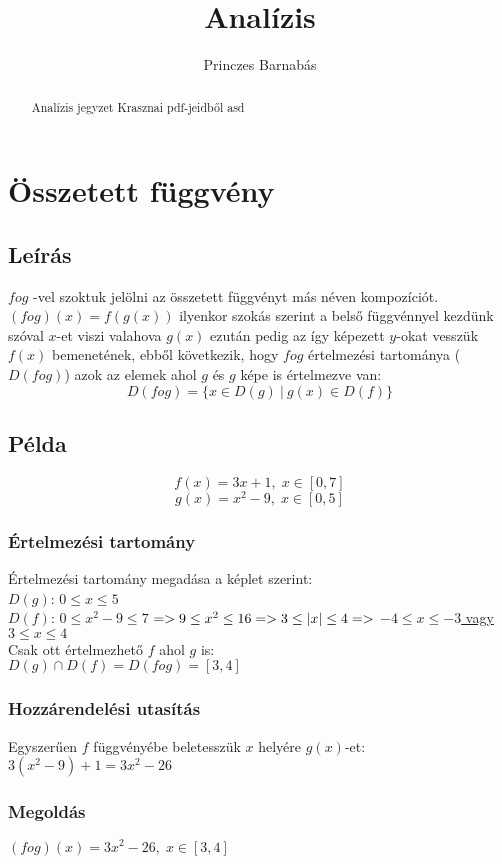 \documentclass{article}
\title{Analízis}
\author{Princzes
Barnabás}
\theoremstyle{mytheoremstyle}
\theoremstyle{mytheoremstyle}
\theoremstyle{myproblemstyle}
\begin{document}
\maketitle
\begin{abstract}
    Analízis jegyzet Krasznai pdf-jeidből asd
\end{abstract}
\section{Összetett függvény}
\subsection{Leírás}
$fog$ -vel szoktuk jelölni az összetett függvényt más néven kompozíciót.\\
$(fog)(x) = f(g(x))$ ilyenkor szokás szerint a belső függvénnyel
kezdünk szóval $x$-et viszi valahova $g(x)$ ezután pedig az így képezett $y$-okat vesszük
$f(x)$ bemenetének, ebből következik, hogy $fog$ értelmezési tartománya ($D(fog)$)
azok az elemek ahol $g$ és $g$ képe is értelmezve van:
$$D(fog)=\{x\in D(g)\:|\:g(x)\in D(f)\}$$
\subsection{Példa}
$$f(x)=3x+1,\;x\in [0,7]$$
$$g(x)=x^2-9,\;x\in [0,5]$$
\subsubsection{Értelmezési tartomány}
Értelmezési tartomány megadása a képlet szerint:\\
$D(g)$: $0\leq x\leq 5$\\
$D(f)$: \underline{$0\leq x^2-9\leq 7$}
$ => 9\leq x^2\leq 16 => 3\leq \abs{x}\leq 4 => $
\underline{$-4\leq x\leq -3$ vagy $3\leq x\leq 4$}\\
Csak ott értelmezhető $f$ ahol $g$ is:\\
$D(g) \cap D(f) = D(fog) = [3,4]$\\
\subsubsection{Hozzárendelési utasítás}
Egyszerűen $f$ függvényébe beletesszük $x$ helyére $g(x)$-et:\\
$3(x^2-9)+1 = 3x^2-26$
\subsubsection{Megoldás}
$(fog)(x) = 3x^2-26,\;x\in [3,4]$
\end{document}
